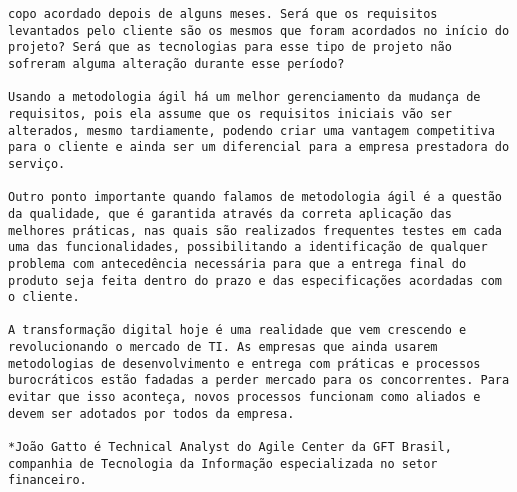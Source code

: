 \begin{verbatim}
copo acordado depois de alguns meses. Será que os requisitos
levantados pelo cliente são os mesmos que foram acordados no início do
projeto? Será que as tecnologias para esse tipo de projeto não
sofreram alguma alteração durante esse período?

Usando a metodologia ágil há um melhor gerenciamento da mudança de
requisitos, pois ela assume que os requisitos iniciais vão ser
alterados, mesmo tardiamente, podendo criar uma vantagem competitiva
para o cliente e ainda ser um diferencial para a empresa prestadora do
serviço.

Outro ponto importante quando falamos de metodologia ágil é a questão
da qualidade, que é garantida através da correta aplicação das
melhores práticas, nas quais são realizados frequentes testes em cada
uma das funcionalidades, possibilitando a identificação de qualquer
problema com antecedência necessária para que a entrega final do
produto seja feita dentro do prazo e das especificações acordadas com
o cliente.

A transformação digital hoje é uma realidade que vem crescendo e
revolucionando o mercado de TI. As empresas que ainda usarem
metodologias de desenvolvimento e entrega com práticas e processos
burocráticos estão fadadas a perder mercado para os concorrentes. Para
evitar que isso aconteça, novos processos funcionam como aliados e
devem ser adotados por todos da empresa.

*João Gatto é Technical Analyst do Agile Center da GFT Brasil,
companhia de Tecnologia da Informação especializada no setor
financeiro.

\end{verbatim}

\newpage

